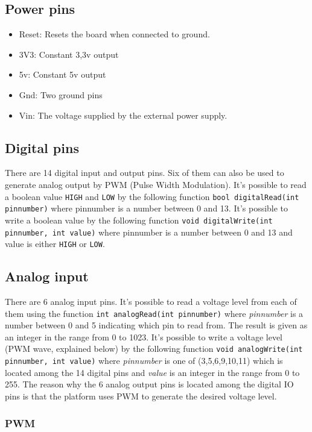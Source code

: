 \documentclass[a4paper,oneside, draft]{memoir}
\begin{document}
\subsection{Power pins}
\begin{itemize}
\item Reset: Resets the board when connected to ground.
\item 3V3: Constant 3,3v output
\item 5v: Constant 5v output
\item Gnd: Two ground pins
\item Vin: The voltage supplied by the external power supply.
\end{itemize}

\subsection{Digital pins}
There are 14 digital input and output pins. Six of them can also be
used to generate analog output by PWM (Pulse Width Modulation). It's
possible to read a boolean value \texttt{HIGH} and \texttt{LOW} by the
following function \texttt{bool digitalRead(int pinnumber)} where
pinnumber is a number between 0 and 13. It's possible to write a
boolean value by the following function \texttt{void digitalWrite(int
  pinnumber, int value)} where pinnumber is a number between 0 and 13
and value is either \texttt{HIGH} or \texttt{LOW}.

\subsection{Analog input}
There are 6 analog input pins. It's possible to read a voltage level
from each of them using the function \texttt{int analogRead(int
  pinnumber)} where \textit{pinnumber} is a number between 0 and 5
indicating which pin to read from. The result is given as an integer
in the range from 0 to 1023. It's possible to write a voltage level
(PWM wave, explained below) by the following function \texttt{void
  analogWrite(int pinnumber, int value)} where \textit{pinnumber} is
one of (3,5,6,9,10,11) which is located among the 14 digital pins and
\textit{value} is an integer in the range from 0 to 255. The reason
why the 6 analog output pins is located among the digital IO pins is
that the platform uses PWM to generate the desired voltage level.

\subsubsection{PWM}
\end{document}
